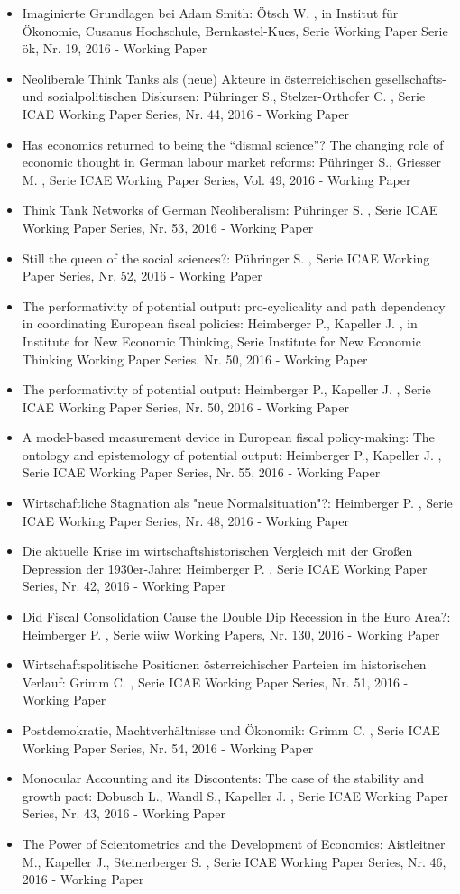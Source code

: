  \begin{itemize} 
	 \item Imaginierte Grundlagen bei Adam Smith: Ötsch W. , in Institut für Ökonomie, Cusanus Hochschule, Bernkastel-Kues, Serie Working Paper Serie ök, Nr. 19, 2016 - Working Paper
	 \item Neoliberale Think Tanks als (neue) Akteure in österreichischen gesellschafts- und sozialpolitischen Diskursen: Pühringer S., Stelzer-Orthofer C. , Serie ICAE Working Paper Series, Nr. 44, 2016 - Working Paper
	 \item Has economics returned to being the “dismal science”? The changing role of economic thought in German labour market reforms: Pühringer S., Griesser M. , Serie ICAE Working Paper Series, Vol. 49, 2016 - Working Paper
	 \item Think Tank Networks of German Neoliberalism: Pühringer S. , Serie ICAE Working Paper Series, Nr. 53, 2016 - Working Paper
	 \item Still the queen of the social sciences?: Pühringer S. , Serie ICAE Working Paper Series, Nr. 52, 2016 - Working Paper
	 \item The performativity of potential output: pro-cyclicality and path dependency in coordinating European fiscal policies: Heimberger P., Kapeller J. , in Institute for New Economic Thinking, Serie Institute for New Economic Thinking  Working Paper Series, Nr. 50, 2016 - Working Paper
	 \item The performativity of potential output: Heimberger P., Kapeller J. , Serie ICAE Working Paper Series, Nr. 50, 2016 - Working Paper
	 \item A model-based measurement device in European fiscal policy-making: The ontology and epistemology of potential output: Heimberger P., Kapeller J. , Serie ICAE Working Paper Series, Nr. 55, 2016 - Working Paper
	 \item Wirtschaftliche Stagnation als "neue Normalsituation"?: Heimberger P. , Serie ICAE Working Paper Series, Nr. 48, 2016 - Working Paper
	 \item Die aktuelle Krise im wirtschaftshistorischen Vergleich mit der Großen Depression der 1930er-Jahre: Heimberger P. , Serie ICAE Working Paper Series, Nr. 42, 2016 - Working Paper
	 \item Did Fiscal Consolidation Cause the Double Dip Recession in the Euro Area?: Heimberger P. , Serie wiiw Working Papers, Nr. 130, 2016 - Working Paper
	 \item Wirtschaftspolitische Positionen österreichischer Parteien im historischen Verlauf: Grimm C. , Serie ICAE Working Paper Series, Nr. 51, 2016 - Working Paper
	 \item Postdemokratie, Machtverhältnisse und Ökonomik: Grimm C. , Serie ICAE Working Paper Series, Nr. 54, 2016 - Working Paper
	 \item Monocular Accounting and its Discontents: The case of the stability and growth pact: Dobusch L., Wandl S., Kapeller J. , Serie ICAE Working Paper Series, Nr. 43, 2016 - Working Paper
	 \item The Power of Scientometrics and the Development of Economics: Aistleitner M., Kapeller J., Steinerberger S. , Serie ICAE Working Paper Series, Nr. 46, 2016 - Working Paper
\end{itemize} 
